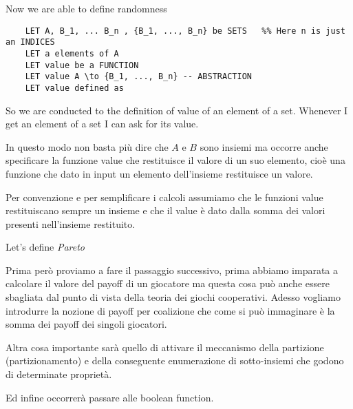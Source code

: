 Now we are able to define randomness

\begin{verbatim}
	LET A, B_1, ... B_n , {B_1, ..., B_n} be SETS   %% Here n is just an INDICES
	LET a elements of A
	LET value be a FUNCTION
	LET value A \to {B_1, ..., B_n} -- ABSTRACTION
	LET value defined as 
\end{verbatim}



So we are conducted to the definition of value of an element of a set. Whenever I get an element of a set I can ask for its value.

In questo modo non basta pi\`u dire che $A$ e $B$ sono insiemi ma occorre anche specificare la funzione value che restituisce il valore di un suo elemento, cioè una funzione che dato in input un elemento dell'insieme restituisce un valore.

Per convenzione e per semplificare i calcoli assumiamo che le funzioni value restituiscano sempre un insieme e che il value è dato dalla somma dei valori presenti nell'insieme restituito.

Let's define \emph{Pareto}

Prima per\`o proviamo a fare il passaggio successivo, prima abbiamo imparata a calcolare il valore del payoff di un giocatore ma questa cosa pu\`o anche essere sbagliata dal punto di vista
della teoria dei giochi cooperativi. Adesso vogliamo introdurre la nozione di payoff per coalizione che come si pu\`o immaginare \`e la somma dei payoff dei singoli giocatori.

Altra cosa importante sar\`a quello di attivare il meccanismo della partizione (partizionamento) e della conseguente enumerazione di sotto-insiemi che godono di determinate propriet\`a.

Ed infine occorrer\`a passare alle boolean function.

